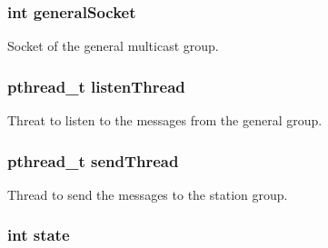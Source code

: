 \subsubsection[{\texorpdfstring{general\+Socket}{generalSocket}}]{\setlength{\rightskip}{0pt plus 5cm}int general\+Socket}\hypertarget{struct_m_c_m__server_stats_a801011852e5b93cad7c4cf405983d797}{}\label{struct_m_c_m__server_stats_a801011852e5b93cad7c4cf405983d797}


Socket of the general multicast group. 

\subsubsection[{\texorpdfstring{listen\+Thread}{listenThread}}]{\setlength{\rightskip}{0pt plus 5cm}pthread\+\_\+t listen\+Thread}\hypertarget{struct_m_c_m__server_stats_a25ed3dd1e477db634fc901c587d710a7}{}\label{struct_m_c_m__server_stats_a25ed3dd1e477db634fc901c587d710a7}


Threat to listen to the messages from the general group. 

\subsubsection[{\texorpdfstring{send\+Thread}{sendThread}}]{\setlength{\rightskip}{0pt plus 5cm}pthread\+\_\+t send\+Thread}\hypertarget{struct_m_c_m__server_stats_aa99c14bb21c7dc3e0f126ee818a54a2b}{}\label{struct_m_c_m__server_stats_aa99c14bb21c7dc3e0f126ee818a54a2b}


Thread to send the messages to the station group. 

\subsubsection[{\texorpdfstring{state}{state}}]{\setlength{\rightskip}{0pt plus 5cm}int state}\hypertarget{struct_m_c_m__server_stats_a89f234133d3efe315836311cbf21c64b}{}\label{struct_m_c_m__server_stats_a89f234133d3efe315836311cbf21c64b}


